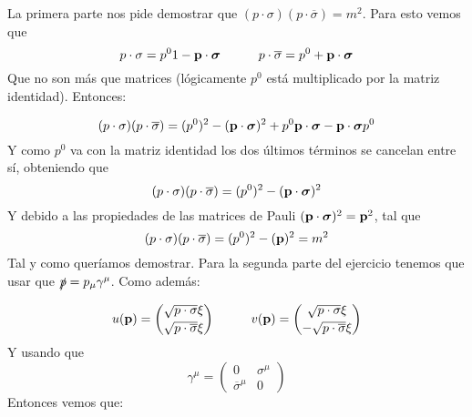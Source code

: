 \begin{solucion} 
	La primera parte nos pide demostrar que $(p\cdot \sigma)(p\cdot \overline{\sigma}) = m^2$. Para esto vemos que
	\begin{equation*}
		p\cdot \sigma = p^0 1 - \mathbf{p} \cdot \boldsymbol{\sigma}  \quad \quad \quad 
		p\cdot \overline{\sigma} = p^0 + \mathbf{p} \cdot \boldsymbol{\sigma} 
	\end{equation*}
	Que no son más que matrices (lógicamente $p^0$ está multiplicado por la matriz identidad). Entonces:
	
	\begin{equation*}
		(p\cdot \sigma) (p\cdot \overline{\sigma})=(p^0)^2- (\mathbf{p} \cdot \boldsymbol{\sigma})^2 + p^0  \mathbf{p}  \cdot \boldsymbol{\sigma}  - \mathbf{p} \cdot \boldsymbol{\sigma} p^0 
	\end{equation*}
	Y como $p^0$ va con la matriz identidad los dos últimos términos se cancelan entre sí, obteniendo que
	\begin{equation*}
		(p\cdot \sigma) (p\cdot \overline{\sigma}) = (p^0)^2 - (\mathbf{p} \cdot \boldsymbol{\sigma})^2 
	\end{equation*}
	Y debido a las propiedades de las matrices de Pauli $(\mathbf{p} \cdot \boldsymbol{\sigma})^2 = \mathbf{p}^2$, tal que 
	\begin{equation*}
		(p\cdot \sigma) (p\cdot \overline{\sigma}) = (p^0)^2 - (\mathbf{p})^2 = m^2
	\end{equation*}
	Tal y como queríamos demostrar. Para la segunda parte del ejercicio tenemos que usar que $\slashed{p} =p_\mu \gamma^\mu$. Como además:
	
	\begin{equation*}
		u (\mathbf{p}) = \binom{\sqrt{p\cdot \sigma} \xi}{\sqrt{p\cdot \overline{\sigma}} \xi} \quad \quad \quad 
		v (\mathbf{p}) = \binom{\sqrt{p\cdot \sigma} \xi}{-\sqrt{p\cdot \overline{\sigma}}\xi}
	\end{equation*}
	Y usando que 
	\begin{equation*}
		\gamma^\mu = \begin{pmatrix}
			0 & \sigma^\mu \\
			\overline{\sigma}^\mu & 0 
		\end{pmatrix}
	\end{equation*}	
	Entonces vemos que: 
	

\end{solucion}
